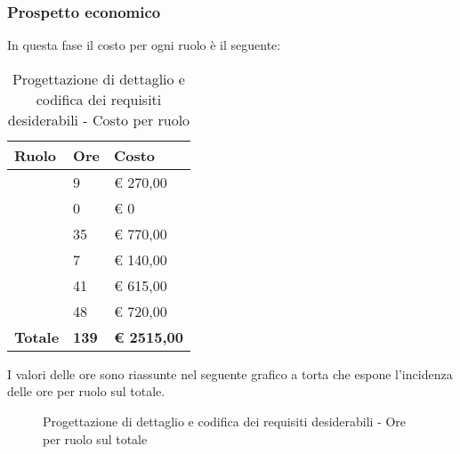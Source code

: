 		\subsubsection{Prospetto economico} %
		\label{ssub:prospetto_economico}
		In questa fase il costo per ogni ruolo è il seguente: \\
				\begin{table}[!ht]
					\begin{center}
						\begin{tabularx}{0.65\textwidth}{|l|l|X|}
							\hline
							\textbf{Ruolo} & \textbf{Ore} & \textbf{Costo} \\
							\hline
							\roleProjectManager & 9 & \euro{} 270,00 \\
							\hline
							\roleAnalyst & 0 & \euro{} 0 \\
							\hline
							\roleDesigner & 35 & \euro{} 770,00 \\
							\hline
							\roleAdministrator & 7 & \euro{} 140,00 \\
							\hline
							\roleProgrammer & 41 & \euro{} 615,00 \\
							\hline
							\roleVerifier & 48 & \euro{} 720,00 \\
							\hline
							\textbf{Totale} & \textbf{139} & \textbf{\euro{} 2515,00} \\
							\hline
						\end{tabularx}
					\end{center}
				\caption{Progettazione di dettaglio e codifica dei requisiti desiderabili - Costo per ruolo}
				\end{table}

				\noindent
				I valori delle ore sono riassunte nel seguente grafico a torta che espone l’incidenza delle ore per ruolo sul totale.
				\begin{center}
					\begin{figure}[htbp]
					\vspace{0.8cm}
					\caption{Progettazione di dettaglio e codifica dei requisiti desiderabili - Ore per ruolo sul totale}
					\end{figure}
				\end{center}

